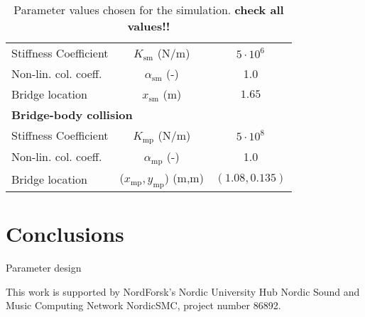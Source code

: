 \documentclass[dvipsnames, pdftex]{article}
\begin{document}
\begin{table}[t]
\begin{center}
\begin{tabular}{|l|c|c|}
    Stiffness Coefficient & $K_\text{sm}$ (N/m) & $5\cdot10^{6}$\\
    Non-lin. col. coeff. &$\alpha_\text{sm}$ (-) & 1.0\\
    Bridge location & $x_\text{sm}$ (m)& $1.65$
    \\
    \hline
    \multicolumn{3}{|l|}{\bf Bridge-body collision}\\\hline
    Stiffness Coefficient & $K_\text{mp}$ (N/m) & $5\cdot10^{8}$\\
    Non-lin. col. coeff. &$\alpha_\text{mp}$ (-) & 1.0\\
    Bridge location & ($x_\text{mp},y_\text{mp}$) (m,m)& $(1.08,0.135)$\\
    \hline
\end{tabular}
\caption{Parameter values chosen for the simulation. \textbf{check all values!!}}
\end{center}
\end{table}
\section{Conclusions}
Parameter design
\begin{acknowledgments}
This work is supported by NordForsk's Nordic
University Hub Nordic Sound and Music Computing Network
NordicSMC, project number 86892.
\end{acknowledgments} 


\end{document}
